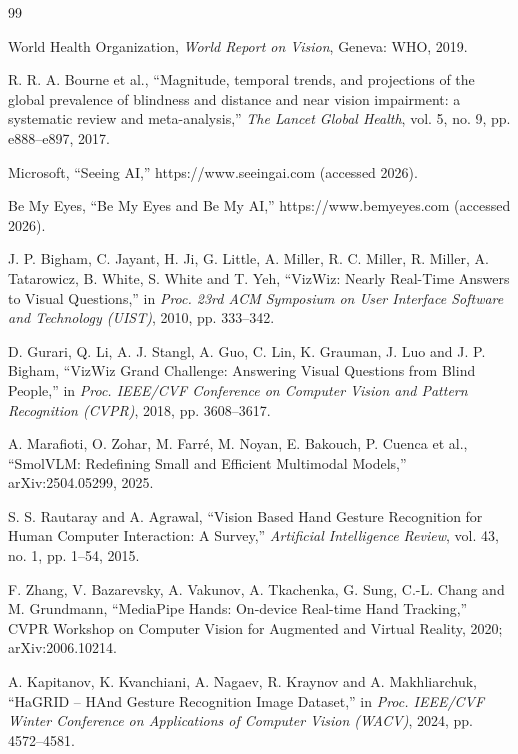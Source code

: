 \documentclass[12pt,singleside,a4paper]{article}
\begin{document}
\renewcommand{\refname}{References}
{\footnotesize\setlength{\itemsep}{0pt}\setlength{\parskip}{0pt}
\begin{thebibliography}{99}
\setlength{\itemsep}{1pt}\setlength{\parsep}{0pt}

 World Health Organization, \textit{World Report on Vision}, Geneva: WHO, 2019.

 R. R. A. Bourne et al., ``Magnitude, temporal trends, and projections of the global prevalence of blindness and distance and near vision impairment: a systematic review and meta-analysis,'' \textit{The Lancet Global Health}, vol. 5, no. 9, pp. e888--e897, 2017.

 Microsoft, ``Seeing AI,'' https://www.seeingai.com (accessed 2026).

 Be My Eyes, ``Be My Eyes and Be My AI,'' https://www.bemyeyes.com (accessed 2026).

 J. P. Bigham, C. Jayant, H. Ji, G. Little, A. Miller, R. C. Miller, R. Miller, A. Tatarowicz, B. White, S. White and T. Yeh, ``VizWiz: Nearly Real-Time Answers to Visual Questions,'' in \textit{Proc. 23rd ACM Symposium on User Interface Software and Technology (UIST)}, 2010, pp. 333--342.

 D. Gurari, Q. Li, A. J. Stangl, A. Guo, C. Lin, K. Grauman, J. Luo and J. P. Bigham, ``VizWiz Grand Challenge: Answering Visual Questions from Blind People,'' in \textit{Proc. IEEE/CVF Conference on Computer Vision and Pattern Recognition (CVPR)}, 2018, pp. 3608--3617.

 A. Marafioti, O. Zohar, M. Farr\'{e}, M. Noyan, E. Bakouch, P. Cuenca et al., ``SmolVLM: Redefining Small and Efficient Multimodal Models,'' arXiv:2504.05299, 2025.

 S. S. Rautaray and A. Agrawal, ``Vision Based Hand Gesture Recognition for Human Computer Interaction: A Survey,'' \textit{Artificial Intelligence Review}, vol. 43, no. 1, pp. 1--54, 2015.

 F. Zhang, V. Bazarevsky, A. Vakunov, A. Tkachenka, G. Sung, C.-L. Chang and M. Grundmann, ``MediaPipe Hands: On-device Real-time Hand Tracking,'' CVPR Workshop on Computer Vision for Augmented and Virtual Reality, 2020; arXiv:2006.10214.

 A. Kapitanov, K. Kvanchiani, A. Nagaev, R. Kraynov and A. Makhliarchuk, ``HaGRID -- HAnd Gesture Recognition Image Dataset,'' in \textit{Proc. IEEE/CVF Winter Conference on Applications of Computer Vision (WACV)}, 2024, pp. 4572--4581.


\end{thebibliography}}
\end{document}
